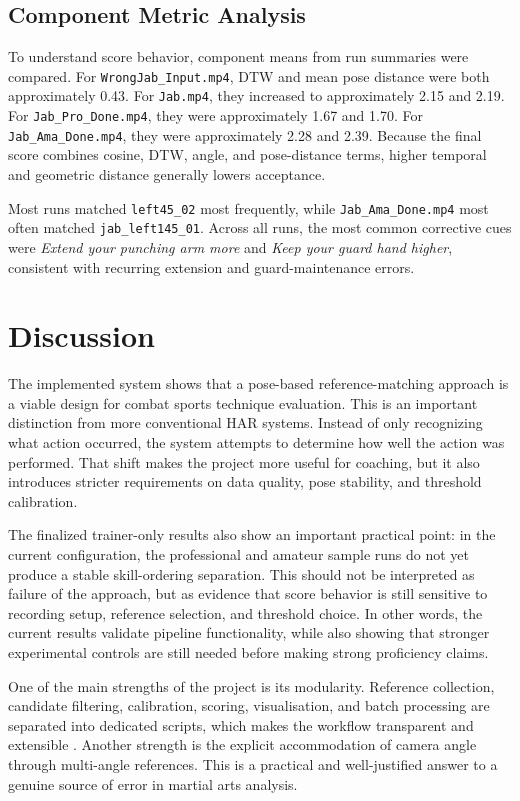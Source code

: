 \documentclass[12pt]{article}
\begin{document}
\subsection{Component Metric Analysis}
To understand score behavior, component means from run summaries were compared. For \texttt{WrongJab\_Input.mp4}, DTW and mean pose distance were both approximately 0.43. For \texttt{Jab.mp4}, they increased to approximately 2.15 and 2.19. For \texttt{Jab\_Pro\_Done.mp4}, they were approximately 1.67 and 1.70. For \texttt{Jab\_Ama\_Done.mp4}, they were approximately 2.28 and 2.39. Because the final score combines cosine, DTW, angle, and pose-distance terms, higher temporal and geometric distance generally lowers acceptance.

Most runs matched \texttt{left45\_02} most frequently, while \texttt{Jab\_Ama\_Done.mp4} most often matched \texttt{jab\_left145\_01}. Across all runs, the most common corrective cues were \textit{Extend your punching arm more} and \textit{Keep your guard hand higher}, consistent with recurring extension and guard-maintenance errors.

\section{Discussion}
The implemented system shows that a pose-based reference-matching approach is a viable design for combat sports technique evaluation. This is an important distinction from more conventional HAR systems. Instead of only recognizing what action occurred, the system attempts to determine how well the action was performed. That shift makes the project more useful for coaching, but it also introduces stricter requirements on data quality, pose stability, and threshold calibration.

The finalized trainer-only results also show an important practical point: in the current configuration, the professional and amateur sample runs do not yet produce a stable skill-ordering separation. This should not be interpreted as failure of the approach, but as evidence that score behavior is still sensitive to recording setup, reference selection, and threshold choice. In other words, the current results validate pipeline functionality, while also showing that stronger experimental controls are still needed before making strong proficiency claims.

One of the main strengths of the project is its modularity. Reference collection, candidate filtering, calibration, scoring, visualisation, and batch processing are separated into dedicated scripts, which makes the workflow transparent and extensible \cite{projectScrape,projectFilter,projectGenerate,projectRunBatch,projectCalibrate}. Another strength is the explicit accommodation of camera angle through multi-angle references. This is a practical and well-justified answer to a genuine source of error in martial arts analysis.
\end{document}
